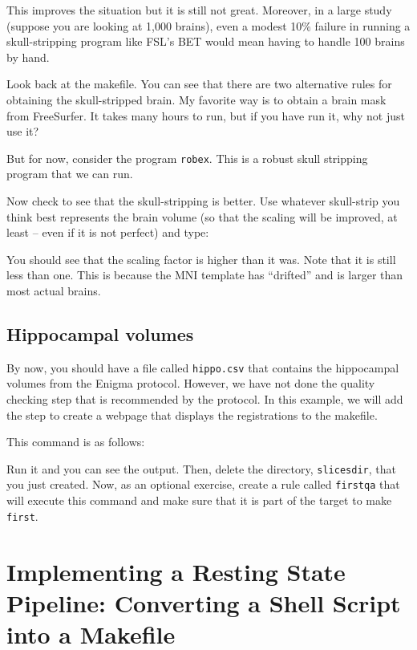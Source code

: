 This improves the situation but it is still not great. Moreover, in a large study (suppose you are looking at 1,000 brains), even a modest 10\% failure in running a skull-stripping program like FSL's BET would mean having to handle 100 brains by hand.  

Look back at the makefile. You can see that there are two alternative rules for
obtaining the skull-stripped brain. My favorite way is to obtain a brain
mask from FreeSurfer. It takes many hours to run, but if you have run 
it, why not just use it? %

But for now, consider the program \texttt{robex}. This is a robust
skull stripping program \citep{Iglesias2011} that we can run.

Now check to see that the skull-stripping is better. Use whatever skull-strip you think best represents the brain volume (so that the scaling will be improved, at least -- even if it is not perfect) and type:

You should see that the scaling factor is higher than it
was. Note that it is still less than one. This is because the MNI
template has ``drifted'' and is larger than most actual brains. 

\subsection{Hippocampal volumes}
By now, you should have a file called \texttt{hippo.csv} that contains the hippocampal volumes from the Enigma protocol. However, we have not done the quality checking step that is recommended by the protocol. In this example, we will add the step to create a webpage that displays the registrations to the makefile.

This command is as follows:

Run it and you can see the output. Then, delete the directory, \texttt{slicesdir}, that you just created. Now, as an optional exercise, create a rule called \texttt{firstqa} that will execute this command and make sure that it is part of the target to make \texttt{first}.

\section{Implementing a Resting State Pipeline: Converting a Shell Script into a Makefile}

